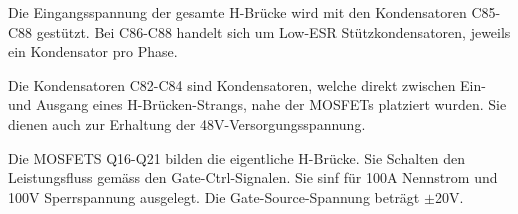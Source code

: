 Die Eingangsspannung der gesamte H-Brücke wird mit den Kondensatoren C85-C88 gestützt.
Bei C86-C88 handelt sich um Low-ESR Stützkondensatoren, jeweils ein Kondensator pro Phase.

Die Kondensatoren C82-C84 sind Kondensatoren, welche direkt zwischen Ein- und Ausgang eines H-Brücken-Strangs, nahe der MOSFETs platziert wurden.
Sie dienen auch zur Erhaltung der 48V-Versorgungsspannung.

Die MOSFETS Q16-Q21 bilden die eigentliche H-Brücke. Sie Schalten den Leistungsfluss gemäss den Gate-Ctrl-Signalen. Sie sinf für 100A Nennstrom und 100V Sperrspannung ausgelegt. Die Gate-Source-Spannung beträgt $\pm$20V.